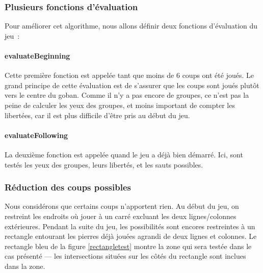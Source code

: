 \documentclass[11pt,a4paper,titlepage,french]{article}
\begin{document}
			\subsubsection{Plusieurs fonctions d'évaluation}
				Pour améliorer cet algorithme, nous allons définir deux fonctions d'évaluation du jeu~:

				\paragraph{evaluateBeginning}
					Cette première fonction est appelée tant que moins de 6 coups ont été joués. Le grand principe de cette évaluation est de s'assurer que les coups sont joués plutôt vers le centre du goban. Comme il n'y a pas encore de groupes, ce n'est pas la peine de calculer les yeux des groupes, et moins important de compter les libertées, car il est plus difficile d'être pris au début du jeu.


				\paragraph{evaluateFollowing}
					La deuxième fonction est appelée quand le jeu a déjà bien démarré. Ici, sont testés les yeux des groupes, leurs libertés, et les sauts possibles.

			\subsubsection{Réduction des coups possibles}
				Nous considérons que certains coups n'apportent rien. Au début du jeu, on restreint les endroits où jouer à un carré excluant les deux lignes/colonnes extérieures. Pendant la suite du jeu, les possibilités  sont encores restreintes à un rectangle entourant les pierres déjà jouées agrandi de deux lignes et colonnes. Le rectangle bleu de la figure \ref{rectangletest} montre la zone qui sera testée dans le cas présenté --- les intersections situées sur les côtés du rectangle sont inclues dans la zone.
\end{document}
